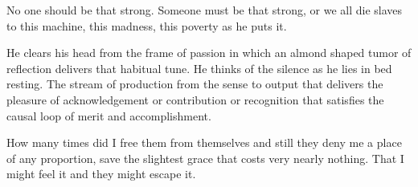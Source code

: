 

No one should be that strong.  Someone must be that strong, or we all
die slaves to this machine, this madness, this poverty as he puts it.

He clears his head from the frame of passion in which an almond shaped
tumor of reflection delivers that habitual tune.  He thinks of the
silence as he lies in bed resting.  The stream of production from the
sense to output that delivers the pleasure of acknowledgement or
contribution or recognition that satisfies the causal loop of merit
and accomplishment.

How many times did I free them from themselves and still they deny me
a place of any proportion, save the slightest grace that costs very
nearly nothing.  That I might feel it and they might escape it.

\bye
